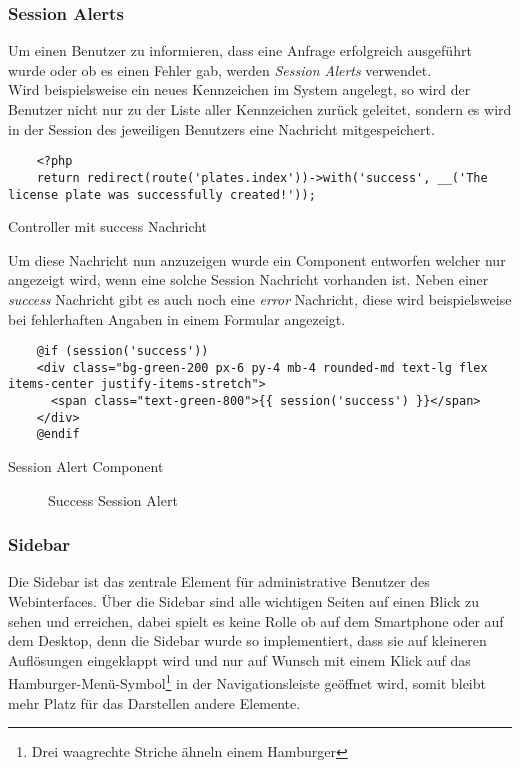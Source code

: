 \subsubsection{Session Alerts}
Um einen Benutzer zu informieren, dass eine Anfrage erfolgreich ausgeführt wurde
oder ob es einen Fehler gab, werden \textit{Session Alerts} verwendet.\\

Wird beispielsweise ein neues Kennzeichen im System angelegt, so wird der
Benutzer nicht nur zu der Liste aller Kennzeichen zurück geleitet, sondern es wird in
der Session des jeweiligen Benutzers eine Nachricht mitgespeichert.

\begin{listing}[H]
  \begin{verbatim}
    <?php
    return redirect(route('plates.index'))->with('success', __('The license plate was successfully created!'));
  \end{verbatim}
  \caption{Controller mit success Nachricht}
\end{listing}

Um diese Nachricht nun anzuzeigen wurde ein Component entworfen welcher nur
angezeigt wird, wenn eine solche Session Nachricht vorhanden ist. Neben einer
\textit{success} Nachricht gibt es auch noch eine \textit{error} Nachricht,
diese wird beispielsweise bei fehlerhaften Angaben in einem Formular angezeigt.

\begin{listing}[H]
  \begin{verbatim}
    @if (session('success'))
    <div class="bg-green-200 px-6 py-4 mb-4 rounded-md text-lg flex items-center justify-items-stretch">
      <span class="text-green-800">{{ session('success') }}</span>
    </div>
    @endif
  \end{verbatim}
  \caption{Session Alert Component}
\end{listing}

\begin{figure}[H]
  \centering
  \caption{Success Session Alert}
\end{figure}

\subsubsection{Sidebar}
Die Sidebar ist das zentrale Element für administrative Benutzer des
Webinterfaces. Über die Sidebar sind alle wichtigen Seiten auf einen Blick zu
sehen und erreichen, dabei spielt es keine Rolle ob auf dem Smartphone oder auf
dem Desktop, denn die Sidebar wurde so implementiert, dass sie auf kleineren
Auflösungen eingeklappt wird und nur auf Wunsch mit einem Klick auf das
Hamburger-Menü-Symbol\footnote{Drei waagrechte Striche ähneln einem Hamburger}
in der Navigationsleiste geöffnet wird, somit bleibt mehr Platz für das
Darstellen andere Elemente.\\


